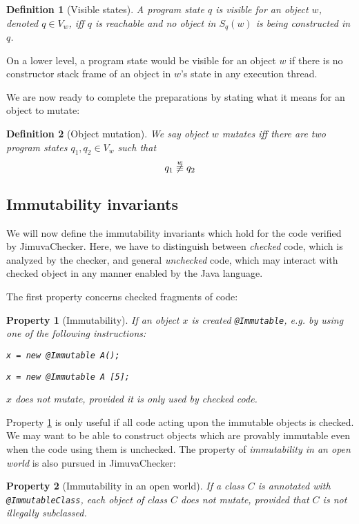 \documentclass{pracamgr}
\theoremstyle{break}
\newtheorem{defi}{Definition}
\theoremstyle{break}
\newtheorem{invariant}{Property}
\theoremstyle{break}
\begin{document}
\begin{defi}[Visible states]
  A program state $q$ is \emph{visible} for an object $w$, denoted $q
  \in V_w$, iff $q$ is reachable and no object in $S_q(w)$ is being
  constructed in $q$.
\end{defi}
On a lower level, a program state would be visible for an object $w$
if there is no constructor stack frame of an object in $w$'s state in
any execution thread.

We are now ready to complete the preparations by stating what it means
for an object to mutate:
\begin{defi}[Object mutation]
  We say object $w$ \emph{mutates} iff there are two program states
  $q_1, q_2 \in V_w$ such that
  $$q_1 \not\stackrel{w}{\equiv} q_2$$
\end{defi}

\subsection{Immutability invariants}
\label{sec:invariants}

We will now define the immutability invariants which hold for the code
verified by JimuvaChecker. Here, we have to distinguish between
\emph{checked} code, which is analyzed by the checker, and general
\emph{unchecked} code, which may interact with checked object in any
manner enabled by the Java language.

The first property concerns checked fragments of code:
\begin{invariant}[Immutability] \label{inv:closed}
  If an object $x$ is created \texttt{@Immutable}, e.g. by using one of
  the following instructions:
  \begin{center}
    \texttt{x = new @Immutable A();}
  \end{center}
  \begin{center}
    \texttt{x = new @Immutable A [5];}
  \end{center}
  $x$ does not mutate, provided it is only used by checked code.
\end{invariant}

Property \ref{inv:closed} is only useful if all code acting upon the
immutable objects is checked. We may want to be able to construct
objects which are provably immutable even when the code using them is
unchecked. The property of \emph{immutability in an open world} is also
pursued in JimuvaChecker:
\begin{invariant}[Immutability in an open world] \label{inv:open}
  If a class $C$ is annotated with \texttt{@ImmutableClass}, each
  object of class $C$ does not mutate, provided that $C$ is not
  illegally subclassed.
\end{invariant}
\end{document}
